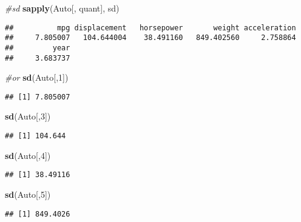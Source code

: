 \documentclass[]{article}
\newenvironment{Shaded}{\begin{snugshade}}{\end{snugshade}}
\newcommand{\CommentTok}[1]{\textcolor[rgb]{0.56,0.35,0.01}{\textit{#1}}}
\newcommand{\DecValTok}[1]{\textcolor[rgb]{0.00,0.00,0.81}{#1}}
\newcommand{\KeywordTok}[1]{\textcolor[rgb]{0.13,0.29,0.53}{\textbf{#1}}}
\newcommand{\NormalTok}[1]{#1}
\begin{document}
\begin{Shaded}
\begin{Highlighting}[]
\CommentTok{#sd}
\KeywordTok{sapply}\NormalTok{(Auto[, quant], sd)}
\end{Highlighting}
\end{Shaded}

\begin{verbatim}
##          mpg displacement   horsepower       weight acceleration 
##     7.805007   104.644004    38.491160   849.402560     2.758864 
##         year 
##     3.683737
\end{verbatim}

\begin{Shaded}
\begin{Highlighting}[]
\CommentTok{#or}
\KeywordTok{sd}\NormalTok{(Auto[,}\DecValTok{1}\NormalTok{])}
\end{Highlighting}
\end{Shaded}

\begin{verbatim}
## [1] 7.805007
\end{verbatim}

\begin{Shaded}
\begin{Highlighting}[]
\KeywordTok{sd}\NormalTok{(Auto[,}\DecValTok{3}\NormalTok{])}
\end{Highlighting}
\end{Shaded}

\begin{verbatim}
## [1] 104.644
\end{verbatim}

\begin{Shaded}
\begin{Highlighting}[]
\KeywordTok{sd}\NormalTok{(Auto[,}\DecValTok{4}\NormalTok{])}
\end{Highlighting}
\end{Shaded}

\begin{verbatim}
## [1] 38.49116
\end{verbatim}

\begin{Shaded}
\begin{Highlighting}[]
\KeywordTok{sd}\NormalTok{(Auto[,}\DecValTok{5}\NormalTok{])}
\end{Highlighting}
\end{Shaded}

\begin{verbatim}
## [1] 849.4026
\end{verbatim}
\end{document}
